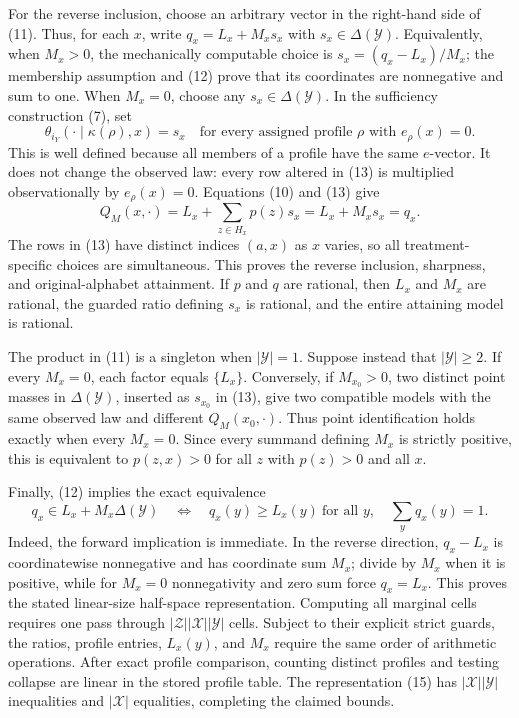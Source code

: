 For the reverse inclusion, choose an arbitrary vector in the right-hand
side of (11).  Thus, for each \(x\), write
\(q_x=L_x+M_xs_x\) with \(s_x\in\Delta(\mathcal Y)\).  Equivalently,
when \(M_x>0\), the mechanically computable choice is
\(s_x=(q_x-L_x)/M_x\); the membership assumption and (12) prove that its
coordinates are nonnegative and sum to one.  When \(M_x=0\), choose any
\(s_x\in\Delta(\mathcal Y)\).  In the sufficiency construction (7), set
\[
 \theta_{i_Y}(\cdot\mid\kappa(\rho),x)=s_x
 \quad\text{for every assigned profile }\rho\text{ with }e_\rho(x)=0.
\tag{13}
\]
This is well defined because all members of a profile have the same
\(e\)-vector.  It does not change the observed law: every row altered in
(13) is multiplied observationally by \(e_\rho(x)=0\).  Equations
(10) and (13) give
\[
 Q_M(x,\cdot)=L_x+\sum_{z\in H_x}p(z)s_x
 =L_x+M_xs_x=q_x.
\tag{14}
\]
The rows in (13) have distinct indices \((a,x)\) as \(x\) varies, so all
treatment-specific choices are simultaneous.  This proves the reverse
inclusion, sharpness, and original-alphabet attainment.  If \(p\) and
\(q\) are rational, then \(L_x\) and \(M_x\) are rational, the guarded
ratio defining \(s_x\) is rational, and the entire attaining model is
rational.

The product in (11) is a singleton when \(\lvert\mathcal Y\rvert=1\).
Suppose instead that \(\lvert\mathcal Y\rvert\geq2\).  If every
\(M_x=0\), each factor equals \(\{L_x\}\).  Conversely, if
\(M_{x_0}>0\), two distinct point masses in \(\Delta(\mathcal Y)\),
inserted as \(s_{x_0}\) in (13), give two compatible models with the same
observed law and different \(Q_M(x_0,\cdot)\).  Thus point identification
holds exactly when every \(M_x=0\).  Since every summand defining
\(M_x\) is strictly positive, this is equivalent to
\(p(z,x)>0\) for all \(z\) with \(p(z)>0\) and all \(x\).

Finally, (12) implies the exact equivalence
\[
 q_x\in L_x+M_x\Delta(\mathcal Y)
 \quad\Longleftrightarrow\quad
 q_x(y)\geq L_x(y)\ \text{for all }y,
 \quad \sum_yq_x(y)=1.
\tag{15}
\]
Indeed, the forward implication is immediate.  In the reverse direction,
\(q_x-L_x\) is coordinatewise nonnegative and has coordinate sum \(M_x\);
divide by \(M_x\) when it is positive, while for \(M_x=0\) nonnegativity
and zero sum force \(q_x=L_x\).  This proves the stated linear-size
half-space representation.  Computing all marginal cells requires one pass
through \(\lvert\mathcal Z\rvert\lvert\mathcal X\rvert
\lvert\mathcal Y\rvert\) cells.  Subject to their explicit strict guards,
the ratios, profile entries, \(L_x(y)\), and \(M_x\) require the same order
of arithmetic operations.  After exact profile comparison, counting
distinct profiles and testing collapse are linear in the stored profile
table.  The representation (15) has
\(\lvert\mathcal X\rvert\lvert\mathcal Y\rvert\) inequalities and
\(\lvert\mathcal X\rvert\) equalities, completing the claimed bounds.